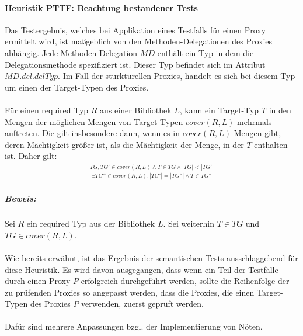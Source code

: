 \documentclass[a4paper,12pt]{article}
\begin{document}
\paragraph{Heuristik PTTF: Beachtung bestandener Tests}
\noindent
\newline
Das Testergebnis, welches bei Applikation eines Testfalls für einen Proxy ermittelt wird, ist maßgeblich von den Methoden-Delegationen des Proxies abhängig. Jede Methoden-Delegation $\mathit{MD}$ enthält ein Typ in dem die Delegationsmethode spezifiziert ist. Dieser Typ befindet sich im Attribut $\mathit{MD.del.delTyp}$. Im Fall der sturkturellen Proxies, handelt es sich bei diesem Typ um einen der Target-Typen des Proxies.\\\\
Für einen required Typ $R$ aus einer Bibliothek $L$, kann ein Target-Typ $T$ in den Mengen der möglichen Mengen von Target-Typen $\mathit{cover(R,L)}$ mehrmals auftreten. Die gilt insbesondere dann, wenn es in $\mathit{cover(R,L)}$ Mengen gibt, deren Mächtigkeit größer ist, als die Mächtigkeit der Menge, in der $T$ enthalten ist. Daher gilt:
\begin{gather*}
\frac{\mathit{TG},\mathit{TG'} \in \mathit{cover(R,L)} \wedge T \in \mathit{TG} \wedge |\mathit{TG}| < |\mathit{TG'}|}{\exists \mathit{TG''} \in \mathit{cover(R,L)} : |\mathit{TG'}| = |\mathit{TG''}| \wedge T \in \mathit{TG''}}
\end{gather*}
\noindent
\subparagraph{Beweis:}
Sei $R$ ein required Typ aus der Bibliothek $L$. Sei weiterhin $T \in \mathit{TG}$ und $\mathit{TG} \in \mathit{cover(R,L)}$.
\\\\
Wie bereits erwähnt, ist das Ergebnis der semantischen Tests ausschlaggebend für diese Heuristik. Es wird davon ausgegangen, dass wenn ein Teil der Testfälle durch einen Proxy $P$ erfolgreich durchgeführt werden, sollte die Reihenfolge der zu prüfenden Proxies so angepasst werden, dass die Proxies, die einen Target-Typen des Proxies $P$ verwenden, zuerst geprüft werden.\\\\
Dafür sind mehrere Anpassungen bzgl. der Implementierung von Nöten. 
\end{document}
